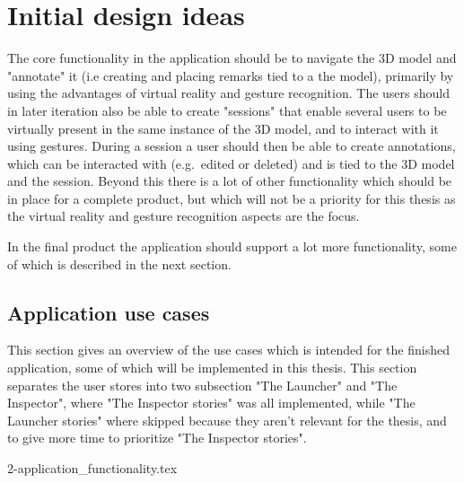 \section{Initial design ideas} 
The core functionality in the application should be to navigate the 3D model and "annotate" it (i.e creating and placing remarks tied to a the model), 
primarily by using the advantages of virtual reality and gesture recognition. 
The users should in later iteration also be able to create "sessions" that enable several users to be virtually present 
in the same instance of the 3D model, and to interact with it using gestures. During a session a user should then be able to create annotations, 
which can be interacted with (e.g.~edited or deleted) and is tied to the 3D model and the session. 
Beyond this there is a lot of other functionality which should be in place for a complete product, but which will not be a priority 
for this thesis as the virtual reality and gesture recognition aspects are the focus. 

In the final product the application should support a lot more functionality, some of which is described in the next section.


\subsection{Application use cases}
This section gives an overview of the use cases which is intended for the finished application, some of which will be implemented in this thesis. 
This section separates the user stores into two subsection "The Launcher" and "The Inspector", where "The Inspector stories" was all implemented, while
"The Launcher stories" where skipped because they aren't relevant for the thesis, and to give more time to prioritize "The Inspector stories".


{2-application_functionality.tex}


